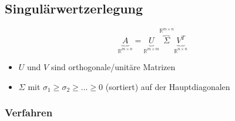 \subsection{Singulärwertzerlegung}
\label{SVD}
\begin{equation*}
    \underbrace{A}_{\mathbb{R}^{m\times n}} = \underbrace{U}_{\mathbb{R}^{m\times m}} \overbrace{\Sigma}^{\mathbb{R}^{m\times n}} \underbrace{V^T}_{\mathbb{R}^{n\times n}}
\end{equation*}

\begin{itemize}
    \item \(U\) und \(V\) sind orthogonale/unitäre Matrizen
    \item \(\Sigma\) mit \(\sigma_1 \geq \sigma_2 \geq \hdots \geq 0\) (sortiert) auf der Hauptdiagonalen
\end{itemize}

\subsubsection{Verfahren}

